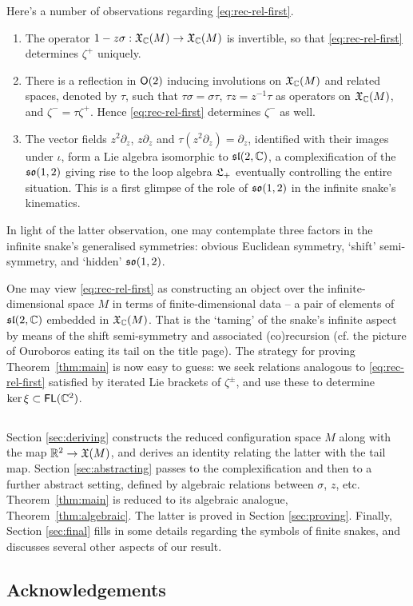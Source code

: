 Here's a number of observations regarding \eqref{eq:rec-rel-first}.
\begin{enumerate}
        \item 
                The operator $1 - z\sigma : \mathfrak{X}_{\mathbb{C}}(M)\to\mathfrak{X}_{\mathbb{C}}(M)$ is invertible,
                so that \eqref{eq:rec-rel-first} determines $\zeta^+$ uniquely.
        \item 
                There is a reflection in $\mathsf{O}(2)$ inducing involutions
                on $\mathfrak{X}_{\mathbb{C}}(M)$ and related spaces, denoted by $\tau$,
                such that $\tau\sigma=\sigma\tau$, $\tau z = z^{-1}\tau$
                as operators on $\mathfrak{X}_{\mathbb{C}}(M)$, and
                $\zeta^- = \tau\zeta^+$. Hence \eqref{eq:rec-rel-first} determines $\zeta^-$ as well.
        \item 
                The vector fields $z^2\partial_z$, $z\partial_z$ and $\tau(z^2\partial_z) = \partial_z$,
                identified with their images under $\iota$,
                form a Lie algebra isomorphic to $\mathfrak{sl}(2,{\mathbb{C}})$, a complexification of the
                $\mathfrak{so}(1,2)$ giving rise to the loop algebra $\mathfrak{L}_+$ eventually controlling the 
                entire situation. This is a first glimpse of the role of $\mathfrak{so}(1,2)$ in the infinite
                snake's kinematics.
\end{enumerate}
In light of the latter observation, one may contemplate three factors in the infinite snake's generalised
symmetries: obvious Euclidean symmetry, `shift' semi-symmetry, and `hidden' $\mathfrak{so}(1,2)$. 

One may view \eqref{eq:rec-rel-first}
as constructing an object over the infinite-dimensional space $M$
in terms of finite-dimensional data -- a pair of elements of $\mathfrak{sl}(2,{\mathbb{C}})$ embedded in $\mathfrak{X}_{\mathbb{C}}(M)$.
That is the `taming' of the snake's infinite aspect by means of the shift semi-symmetry and associated (co)recursion 
(cf. the picture of Ouroboros eating its tail on the title page).
The strategy for proving Theorem~\ref{thm:main} is now easy to guess: we seek relations analogous
to \eqref{eq:rec-rel-first} satisfied by iterated Lie brackets of $\zeta^\pm$, and use these to
determine $\ker\xi \subset \operatorname{\mathsf{FL}}({\mathbb{C}}^2)$.

\subsection{}
Section \ref{sec:deriving} constructs the reduced configuration space $M$ along
with the map ${\mathbb{R}}^2 \to \mathfrak{X}(M)$, and derives an identity relating the latter with
the tail map. Section \ref{sec:abstracting} passes to the complexification and
then to a further abstract setting, defined by algebraic relations between
$\sigma$, $z$, etc. Theorem~\ref{thm:main} is reduced to its algebraic analogue, Theorem~\ref{thm:algebraic}.
The latter is proved in Section \ref{sec:proving}. Finally, Section \ref{sec:final} fills in
some details regarding the symbols of finite snakes, and discusses several other aspects of
our result.

\subsection*{Acknowledgements}
\endinput
